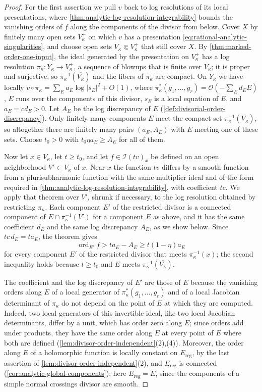 \begin{proof}
For the first assertion we pull $v$ back to log resolutions of its local presentations, where \cref{thm:analytic-log-resolution-integrability} bounds the vanishing orders of $f$ along the components of the divisor from below. Cover $X$ by finitely many open sets $V_\kappa^+$ on which $v$ has a presentation \eqref{eq:rational-analytic-singularities}, and choose open sets $V_\kappa\Subset V_\kappa^+$ that still cover $X$. By \cref{thm:marked-order-one-input}, the ideal generated by the presentation on $V_\kappa^+$ has a log resolution $\pi_\kappa\colon Y_\kappa\to V_\kappa^+$, a sequence of blowups that is finite over $V_\kappa$; it is proper and surjective, so $\pi_\kappa^{-1}(\overline{V_\kappa})$ and the fibers of $\pi_\kappa$ are compact. On $Y_\kappa$ we have locally $v\circ\pi_\kappa=\sum_Ea_E\log|s_E|^2+O(1)$, where $\pi_\kappa^*(g_1,\ldots,g_r)=\mathcal O(-\sum_Ed_EE)$, $E$ runs over the components of this divisor, $s_E$ is a local equation of $E$, and $a_E=cd_E>0$. Let $A_E$ be the log discrepancy of $E$ (\cref{def:divisorial-order-discrepancy}). Only finitely many components $E$ meet the compact set $\pi_\kappa^{-1}(\overline{V_\kappa})$, so altogether there are finitely many pairs $(a_E,A_E)$ with $E$ meeting one of these sets. Choose $t_0>0$ with $t_0\eta a_E\geq A_E$ for all of them.

Now let $x\in V_\kappa$, let $t\geq t_0$, and let $f\in\mathcal I(tv)_x$ be defined on an open neighborhood $V'\subset V_\kappa$ of $x$. Near $x$ the function $tv$ differs by a smooth function from a plurisubharmonic function with the same multiplier ideal and of the form required in \cref{thm:analytic-log-resolution-integrability}, with coefficient $tc$. We apply that theorem over $V'$, shrunk if necessary, to the log resolution obtained by restricting $\pi_\kappa$. Each component $E'$ of the restricted divisor is a connected component of $E\cap\pi_\kappa^{-1}(V')$ for a component $E$ as above, and it has the same coefficient $d_E$ and the same log discrepancy $A_E$, as we show below. Since $tc\,d_E=ta_E$, the theorem gives
\[
 \operatorname{ord}_{E'}f>ta_E-A_E\geq t(1-\eta)a_E
\]
for every component $E'$ of the restricted divisor that meets $\pi_\kappa^{-1}(x)$; the second inequality holds because $t\geq t_0$ and $E$ meets $\pi_\kappa^{-1}(\overline{V_\kappa})$.

The coefficient and the log discrepancy of $E'$ are those of $E$ because the vanishing orders along $E$ of a local generator of $\pi_\kappa^*(g_1,\ldots,g_r)$ and of a local Jacobian determinant of $\pi_\kappa$ do not depend on the point of $E$ at which they are computed. Indeed, two local generators of this invertible ideal, like two local Jacobian determinants, differ by a unit, which has order zero along $E$; since orders add under products, they have the same order along $E$ at every point of $E$ where both are defined (\cref{lem:divisor-order-independent}(2),(4)). Moreover, the order along $E$ of a holomorphic function is locally constant on $E_{\mathrm{reg}}$, by the last assertion of \cref{lem:divisor-order-independent}(2), and $E_{\mathrm{reg}}$ is connected (\cref{cor:analytic-global-components}); here $E_{\mathrm{reg}}=E$, since the components of a simple normal crossings divisor are smooth.


\end{proof}
